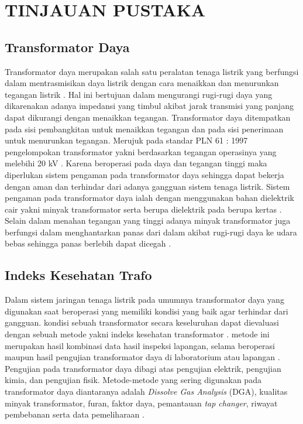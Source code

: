 \chapter{TINJAUAN PUSTAKA}
\label{BAB2:tinjauan}
\section{Transformator Daya}

Transformator daya merupakan salah satu peralatan tenaga listrik yang berfungsi dalam mentrasmisikan daya listrik dengan cara menaikkan dan menurunkan tegangan  listrik \cite{sutaryono2015analisa}. Hal ini bertujuan dalam mengurangi rugi-rugi daya yang dikarenakan adanya impedansi yang timbul akibat jarak transmisi yang panjang dapat dikurangi dengan menaikkan tegangan. Transformator daya ditempatkan pada sisi pembangkitan untuk menaikkan tegangan dan pada sisi penerimaan untuk menurunkan tegangan. Merujuk pada standar PLN 61 : 1997 pengelompokan transformator yakni berdasarkan tegangan operasinya yang melebihi 20 kV \cite{sutaryono2015analisa}. Karena beroperasi pada daya dan tegangan tinggi maka diperlukan sistem pengaman pada transformator daya sehingga dapat bekerja dengan aman dan terhindar dari adanya gangguan sistem tenaga listrik. Sistem pengaman pada transformator daya ialah dengan menggunakan bahan dielektrik cair yakni minyak transformator serta berupa dielektrik pada berupa kertas . Selain dalam menahan tegangan yang tinggi adanya minyak transformator juga berfungsi dalam menghantarkan panas dari dalam akibat rugi-rugi daya ke udara bebas sehingga panas berlebih dapat dicegah \cite{krause2012power}.




\section{Indeks Kesehatan Trafo}
Dalam sistem jaringan tenaga listrik pada umumnya transformator daya yang digunakan saat beroperasi yang memiliki kondisi yang baik agar terhindar dari gangguan. kondisi sebuah transformator secara keseluruhan dapat dievaluasi dengan sebuah metode yakni indeks kesehatan transformator \cite{nurcahyanto2019analysis}. metode ini merupakan hasil kombinasi data hasil inspeksi lapangan, selama beroperasi maupun hasil pengujian transformator daya di laboratorium atau lapangan \cite{ortiz2016health}. Pengujian pada transformator daya dibagi atas pengujian elektrik, pengujian kimia, dan pengujian fisik. Metode-metode yang sering digunakan pada transformator daya diantaranya adalah \textit{Dissolve Gas Analysis} (DGA), kualitas minyak transformator, furan, faktor daya, pemantauan \textit{tap changer}, riwayat pembebanan serta data pemeliharaan \cite{jahromi2009approach}.

